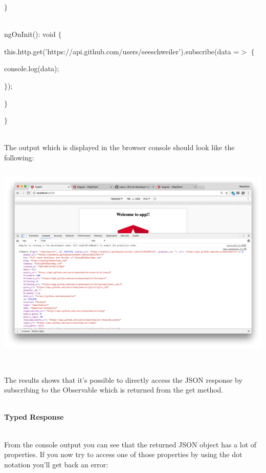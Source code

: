 \documentclass{article}
\begin{document}
\noindent $\mathrm{\}}$

\noindent  

\noindent 

\noindent \\ ngOnInit(): void $\mathrm{\{}$ 

\noindent this.http.get('https://api.github.com/users/seeschweiler').subscribe(data =$\mathrm{>}$ $\mathrm{\{}$

\noindent console.log(data);

\noindent $\mathrm{\}}$);

\noindent $\mathrm{\}}$

\noindent $\mathrm{\}}$

\noindent \\ The output which is displayed in the browser console should look like the following:

\begin{center}
	\noindent \includegraphics*[width=5.92in, height=3.77in]{IMG-06-02}
\end{center}

\noindent  

\noindent \\ The results shows that it's possible to directly access the JSON response by subscribing to the Observable which is returned from the get method.

\noindent 
\newpage
\noindent \\ \textbf{Typed Response}

\noindent \\ From the console output you can see that the returned JSON object has a lot of properties. If you now try to access one of those properties by using the dot notation you'll get back an error:
\end{document}
